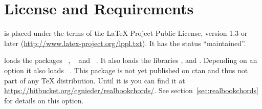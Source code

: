 \documentclass[toc=index,toc=bib]{cnpkgdoc}
\begin{document}
\section{License and Requirements}

\guitarchordschemes is placed under the terms of the \LaTeX{} Project Public License,
version 1.3 or later (\url{http://www.latex-project.org/lppl.txt}).
It has the status “maintained”.

\guitarchordschemes loads the packages \TikZ~\cite{pkg:tikz},
~\cite{pkg:etoolbox} and ~\cite{pkg:pgfopts}.
It also loads the \TikZ{} libraries ,  and .
Depending on an option it also loads ~\cite{pkg:realbookchords}.
This package is not yet published on \ac{ctan} and thus not part of any \TeX{}
distribution. Until it is you can find it at
\url{https://bitbucket.org/cgnieder/realbookchords/}.
See section~\ref{sec:realbookchords} for details on this option.
\end{document}
